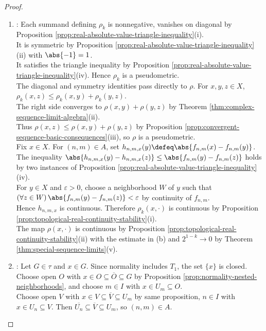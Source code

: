 \begin{theorem}
\begin{proof}
\begin{enumerate}[label=\roman*.]
\begin{enumerate}[label=(\alph*)]
\item {}: Each summand defining $\rho_k$ is nonnegative, vanishes on diagonal by Proposition \ref{prop:real-absolute-value-triangle-inequality}(i).\\
It is symmetric by Proposition \ref{prop:real-absolute-value-triangle-inequality}(ii) with $\abs{-1}=1$.\\
It satisfies the triangle inequality by Proposition \ref{prop:real-absolute-value-triangle-inequality}(iv). Hence $\rho_k$ is a pseudometric.\\
The diagonal and symmetry identities pass directly to $\rho$. For $x,y,z\in X$, $\rho_k(x,z)\leq\rho_k(x,y)+\rho_k(y,z)$.\\
The right side converges to $\rho(x,y)+\rho(y,z)$ by Theorem \ref{thm:complex-sequence-limit-algebra}(ii).\\
Thus $\rho(x,z)\leq\rho(x,y)+\rho(y,z)$ by Proposition \ref{prop:convergent-sequence-basic-consequences}(iii), so $\rho$ is a pseudometric.\\
Fix $x\in X$. For $(n,m)\in A$, set $h_{n,m,x}(y)\defeq\abs{f_{n,m}(x)-f_{n,m}(y)}$.\\
The inequality $\abs{h_{n,m,x}(y)-h_{n,m,x}(z)}\leq\abs{f_{n,m}(y)-f_{n,m}(z)}$ holds by two instances of Proposition \ref{prop:real-absolute-value-triangle-inequality}(iv).\\
For $y\in X$ and $\varepsilon>0$, choose a neighborhood $W$ of $y$ such that $(\forall z\in W)\,\abs{f_{n,m}(y)-f_{n,m}(z)}<\varepsilon$ by continuity of $f_{n,m}$.\\
Hence $h_{n,m,x}$ is continuous. Therefore $\rho_k(x,\cdot)$ is continuous by Proposition \ref{prop:topological-real-continuity-stability}(i).\\
The map $\rho(x,\cdot)$ is continuous by Proposition \ref{prop:topological-real-continuity-stability}(ii) with the estimate in (b) and $2^{1-k}\to0$ by Theorem \ref{thm:special-sequence-limits}(v).
\item {}: Let $G\in\tau$ and $x\in G$. Since normality includes $T_1$, the set $\{x\}$ is closed.\\
Choose open $O$ with $x\in O\subseteq\overline{O}\subseteq G$ by Proposition \ref{prop:normality-nested-neighborhoods}, and choose $m\in I$ with $x\in U_m\subseteq O$.\\
Choose open $V$ with $x\in V\subseteq\overline{V}\subseteq U_m$ by same proposition, $n\in I$ with $x\in U_n\subseteq V$. Then $\overline{U_n}\subseteq\overline{V}\subseteq U_m$, so $(n,m)\in A$.\\

\end{enumerate}
\end{enumerate}
\end{proof}
\end{theorem}

